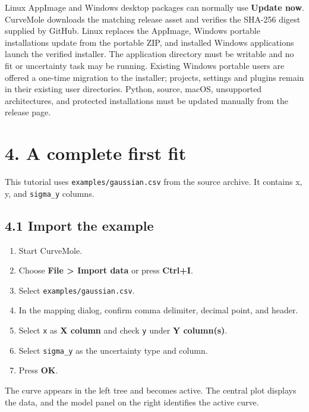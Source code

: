 \documentclass[
  10pt,
  a4paper,
  oneside]{scrreprt}
\providecommand{\tightlist}{%
  \setlength{\itemsep}{0pt}\setlength{\parskip}{0pt}}
\begin{document}
Linux AppImage and Windows desktop packages can normally use
\textbf{Update now}. CurveMole downloads the matching release asset and
verifies the SHA-256 digest supplied by GitHub. Linux replaces the
AppImage, Windows portable installations update from the portable ZIP,
and installed Windows applications launch the verified installer. The
application directory must be writable and no fit or uncertainty task
may be running. Existing Windows portable users are offered a one-time
migration to the installer; projects, settings and plugins remain in
their existing user directories. Python, source, macOS, unsupported
architectures, and protected installations must be updated manually from
the release page.

\hypertarget{a-complete-first-fit}{%
\chapter{4. A complete first fit}\label{a-complete-first-fit}}

This tutorial uses \texttt{examples/gaussian.csv} from the source
archive. It contains x, y, and \texttt{sigma\_y} columns.

\hypertarget{import-the-example}{%
\section{4.1 Import the example}\label{import-the-example}}

\begin{enumerate}
\def\labelenumi{\arabic{enumi}.}
\tightlist
\item
  Start CurveMole.
\item
  Choose \textbf{File \textgreater{} Import data} or press
  \textbf{Ctrl+I}.
\item
  Select \texttt{examples/gaussian.csv}.
\item
  In the mapping dialog, confirm comma delimiter, decimal point, and
  header.
\item
  Select \texttt{x} as \textbf{X column} and check \texttt{y} under
  \textbf{Y column(s)}.
\item
  Select \texttt{sigma\_y} as the uncertainty type and column.
\item
  Press \textbf{OK}.
\end{enumerate}

The curve appears in the left tree and becomes active. The central plot
displays the data, and the model panel on the right identifies the
active curve.
\end{document}
